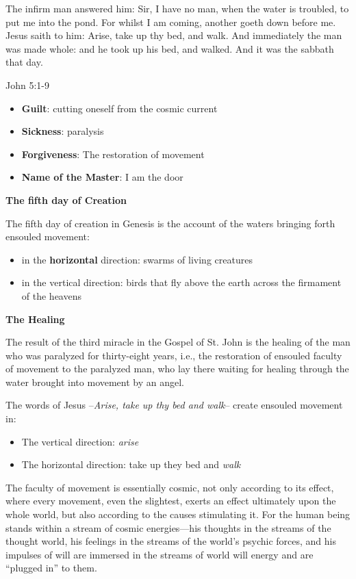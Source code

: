 The infirm man answered him: Sir, I have no man, when the water is troubled, to put me into the pond. For whilst I am
coming, another goeth down before me. Jesus saith to him: Arise, take up thy bed, and walk. And immediately the man was
made whole: and he took up his bed, and walked. And it was the sabbath that day. \begin{flushright} John 5:1-9\end{flushright}

\begin{itemize}
\item \textbf{Guilt}: cutting oneself from the cosmic current 
\item \textbf{Sickness}: paralysis 
\item \textbf{Forgiveness}: The restoration of movement 
\item \textbf{Name of the Master}: I am the door 
\end{itemize}
\textbf{The fifth day of Creation}

The fifth day of creation in Genesis is the account of the waters bringing forth ensouled movement:

\begin{itemize}
\item in the \textbf{horizontal} direction: swarms of living creatures 
\item in the vertical direction: birds that fly above the earth across the firmament of the heavens 
\end{itemize}
\textbf{The Healing}

The result of the third miracle in the Gospel of St. John is the healing of the man who was paralyzed for thirty-eight
years, i.e., the restoration of ensouled faculty of movement to the paralyzed man, who lay there waiting for healing
through the water brought into movement by an angel.

The words of Jesus --\textit{Arise, take up thy bed and walk}-- create ensouled movement in:

\begin{itemize}
\item The vertical direction: \emph{arise} 
\item The horizontal direction: take up they bed and \emph{walk} 
\end{itemize}
The faculty of movement is essentially cosmic, not only according to its effect, where every movement, even the
slightest, exerts an effect ultimately upon the whole world, but also according to the causes stimulating it. For the
human being stands within a stream of cosmic energies—his thoughts in the streams of the thought
world, his feelings in the streams of the world's psychic forces, and his impulses of will are
immersed in the streams of world will energy and are “plugged in” to them.

